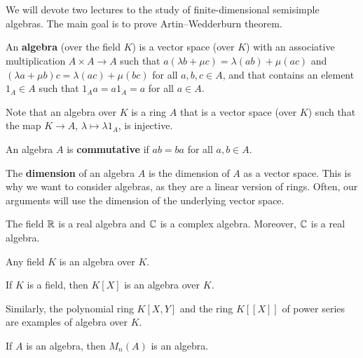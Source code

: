 \chapter{}


We will devote two lectures to the study of 
finite-dimensional semisimple algebras. The main goal is to
prove Artin--Wedderburn theorem. 

\begin{definition}
	An \textbf{algebra} (over the field $K$) is a vector space (over $K$) 
	with an associative multiplication $A\times A\to A$ such that
	$a(\lambda b+\mu c)=\lambda(ab)+\mu(ac)$ and
	$(\lambda a+\mu b)c=\lambda(ac)+\mu (bc)$ for all $a,b,c\in A$, and 
	that contains an element $1_A\in A$ such that $1_Aa=a1_A=a$ for all $a\in A$.   
\end{definition}

Note that an algebra over $K$ is a ring $A$ that is a vector space
(over $K$) such that the map $K\to A$, $\lambda\mapsto \lambda1_A$, is injective. 

\begin{definition}
	An algebra $A$ is \textbf{commutative} if $ab=ba$ for all $a,b\in A$. 
\end{definition}

The \textbf{dimension} of an algebra $A$ is the dimension of $A$ as a vector space. This is why we want to consider algebras, as 
they are a linear version of rings. Often, our arguments will use the dimension of the underlying vector space.  

\begin{example}
	The field $\mathbb{R}$ is a real algebra and  
	$\mathbb{C}$ is a complex algebra. Moreover, $\mathbb{C}$ is a real algebra. 
\end{example}

Any field $K$ is an algebra over $K$.

\begin{example}
	If $K$ is a field, then $K[X]$ is an algebra over $K$. 
\end{example}

Similarly, the polynomial ring $K[X,Y]$ and the ring $K[\![X]\!]$ of power series
are examples of algebra over $K$. 

\begin{example}
	If $A$ is an algebra, then  $M_n(A)$ is an algebra. 
\end{example}

